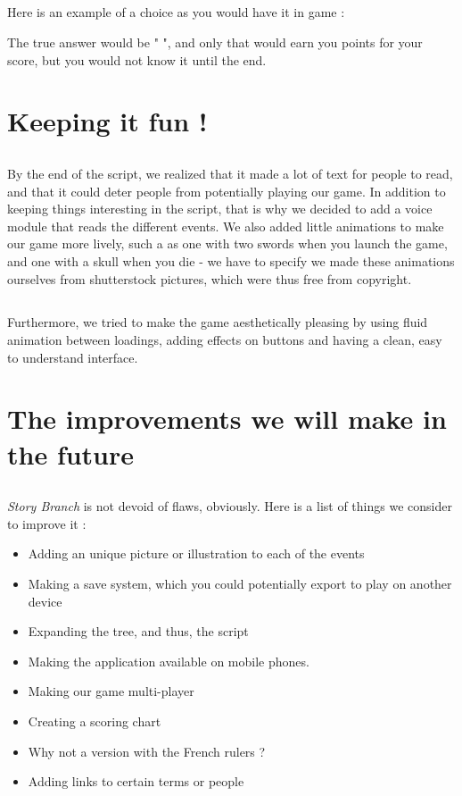 \documentclass{scrreprt}
\begin{document}
\newpage
\subsection*{} Here is an example of a choice as you would have it in game :




The true answer would be " ", and only that would earn you points for your score, but you would not know it until the end.


\section{Keeping it fun !}

\subsection*{} By the end of the script, we realized that it made a lot of text for people to read, and that it could deter people from potentially playing our game. In addition to keeping things interesting in the script, that is why we decided to add a voice module that reads the different events. We also added little animations to make our game more lively, such a as one with two swords when you launch the game, and one with a skull when you die - we have to specify we made these animations ourselves from shutterstock pictures, which were thus free from copyright.

\subsection*{}Furthermore, we tried to make the game aesthetically pleasing by using fluid animation between loadings, adding effects on buttons and having a clean, easy to understand interface.

\newpage
\section{The improvements we will make in the future}
\subsection*{}
\textit{Story Branch} is not devoid of flaws, obviously. Here is a list of things we consider to improve it :
\begin{itemize}
\item Adding an unique picture or illustration to each of the events
\item Making a save system, which you could potentially export to play on another device
\item Expanding the tree, and thus, the script
\item Making the application available on mobile phones.
\item Making our game multi-player
\item Creating a scoring chart
\item Why not a version with the French rulers ?
\item Adding links to certain terms or people
\end{itemize}
\end{document}
